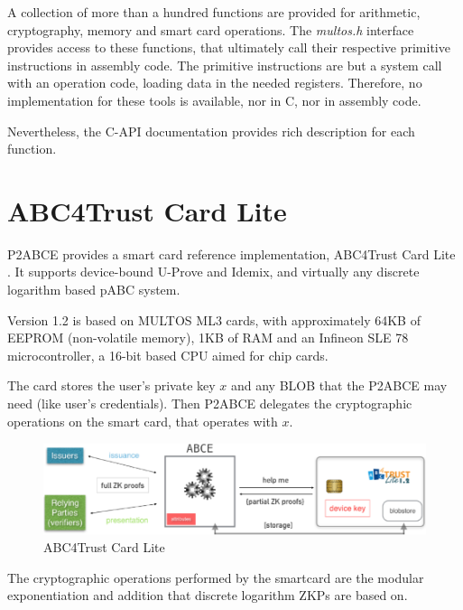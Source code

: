 A collection of more than a hundred functions are provided for arithmetic, cryptography, memory and smart card operations. The \textit{multos.h} interface provides access to these functions, that ultimately call their respective primitive instructions in assembly code. The primitive instructions are but a system call with an operation code, loading data in the needed registers. Therefore,  no implementation for these tools is available, nor in C, nor in assembly code.

Nevertheless, the C-API documentation \citep{MultosTechLib} provides rich description for each function.





\section{ABC4Trust Card Lite}

P2ABCE provides a smart card reference implementation, ABC4Trust Card Lite \citep{ABC4TCardLite}. It supports device-bound U-Prove and Idemix, and virtually any discrete logarithm based pABC system.

Version 1.2 is based on MULTOS ML3 cards, with approximately 64KB of EEPROM (non-volatile memory), 1KB of RAM and an Infineon SLE 78 microcontroller, a 16-bit based CPU aimed for chip cards.

The card stores the user's private key $x$ and any \ac{BLOB} that the P2ABCE may need (like user's credentials). Then P2ABCE delegates the cryptographic operations on the smart card, that operates with $x$.

\begin{figure}[bth]
	\begin{center}
		\includegraphics[width=\linewidth]{gfx/ABC4TCardLite}
	\end{center}
	\caption{ABC4Trust Card Lite}
	\label{fig:ABC4TCardLite}
\end{figure}

The cryptographic operations performed by the smartcard are the modular exponentiation and addition that discrete logarithm ZKPs are based on.

